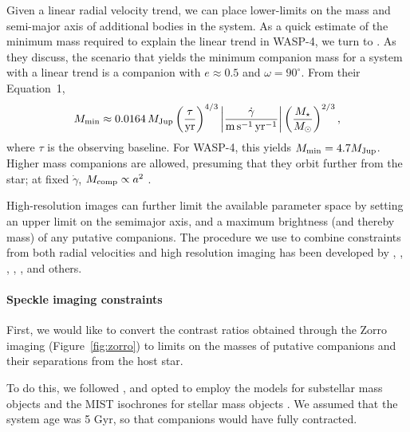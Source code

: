 \documentclass[12pt,twocolumn,tighten]{aastex62}
\begin{document}
Given a linear radial velocity trend, we can place lower-limits on the
mass and semi-major axis of additional bodies in the system.  As a
quick estimate of the minimum mass required to explain the linear
trend in WASP-4, we turn to \citet{feng_california_2015}.  As they
discuss, the scenario that yields the minimum companion mass for a
system with a linear trend is a companion with $e\approx0.5$ and
$\omega=90^\circ$.  From their Equation~1,
\begin{equation}
 M_{\rm min} \approx 0.0164\,M_{\rm Jup}
  \left( \frac{\tau}{{\rm yr}} \right)^{4/3}
  \left| \frac{\dot{\gamma}}{{\rm m\,s^{-1}\,yr^{-1}}} \right|
  \left( \frac{M_\star}{{M_\odot}} \right)^{2/3},
\end{equation}
where $\tau$ is the observing baseline.
For WASP-4, this yields $M_{\rm min} = 4.7 M_{\rm Jup}$.  Higher mass
companions are allowed, presuming that they orbit further from the
star; at fixed $\dot{\gamma}$, $M_{\rm comp} \propto a^2$
\citep{torres_substellar_1999,liu_crossing_2002}.

High-resolution images can further limit the available parameter space
by setting an upper limit on the semimajor axis, and a maximum
brightness (and thereby mass) of any putative companions.
The procedure we use to combine constraints from both radial
velocities and high resolution imaging has been developed by
\citet{wright_linear_trends_2007}, \citet{crepp_trends_2012},
\citet{montet_trends_2014}, \citet{knutson_friends_2014},
\citet{bryan_statistics_2016,bryan_excess_2019}, and others.

\paragraph{Speckle imaging constraints}

First, we would like to convert the contrast ratios obtained through
the Zorro imaging (Figure~\ref{fig:zorro}) to limits on the masses of
putative companions and their separations from the host star.

To do this, we followed \citet{montet_trends_2014}, and opted to
employ the \citet{baraffe_evolutionary_2003} models for substellar
mass objects and the MIST isochrones for stellar mass objects
\citep{paxton_modules_2011,paxton_modules_2013,paxton_modules_2015,dotter_mesa_2016,choi_mesa_2016}.
We assumed that the system age was 5 Gyr, so that companions would
have fully contracted.
\end{document}
